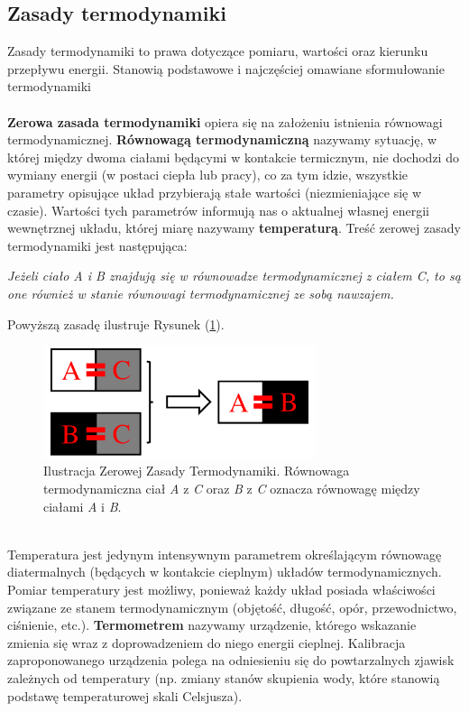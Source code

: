 \documentclass[12pt,a4paper,openright]{report} %
\begin{document}
\subsection{Zasady termodynamiki} 
Zasady termodynamiki to prawa dotyczące pomiaru, wartości oraz kierunku przepływu energii. Stanowią podstawowe i najczęściej omawiane sformułowanie termodynamiki\\
\\
\textbf{Zerowa zasada termodynamiki} opiera się na założeniu istnienia równowagi termodynamicznej. \textbf{Równowagą termodynamiczną} nazywamy sytuację, w której między dwoma ciałami będącymi w kontakcie termicznym, nie dochodzi do wymiany energii (w postaci ciepła lub pracy), co za tym idzie, wszystkie parametry opisujące układ przybierają stałe wartości (niezmieniające się w czasie). Wartości tych parametrów informują nas o aktualnej własnej energii wewnętrznej układu, której miarę nazywamy \textbf{temperaturą}. 
Treść zerowej zasady termodynamiki jest następująca:
%
\begin{center}
\textit{Jeżeli ciało A i B znajdują się w równowadze termodynamicznej z ciałem C, to są one również w stanie równowagi termodynamicznej ze sobą nawzajem.}
\end{center}
Powyższą zasadę ilustruje Rysunek (\ref{3_ZZT}).
\begin{figure}[h!]
\centering
\includegraphics[width=8cm, clip]{rysunki/3_ZZT}
\caption{Ilustracja Zerowej Zasady Termodynamiki. Równowaga termodynamiczna ciał \textit{A} z \textit{C} oraz \textit{B} z \textit{C} oznacza równowagę między ciałami \textit{A} i \textit{B}.}
\label{3_ZZT}
\end{figure}
%
\\
Temperatura jest jedynym intensywnym parametrem określającym równowagę diatermalnych (będących w kontakcie cieplnym) układów termodynamicznych. Pomiar temperatury jest możliwy, ponieważ każdy układ posiada właściwości związane ze stanem termodynamicznym (objętość, długość, opór, przewodnictwo, ciśnienie, etc.). 
\textbf{Termometrem} nazywamy urządzenie, którego wskazanie zmienia się wraz z doprowadzeniem do niego energii cieplnej. Kalibracja zaproponowanego urządzenia polega na odniesieniu się do powtarzalnych zjawisk zależnych od temperatury (np. zmiany stanów skupienia wody, które stanowią podstawę temperaturowej skali Celsjusza).
\end{document}
